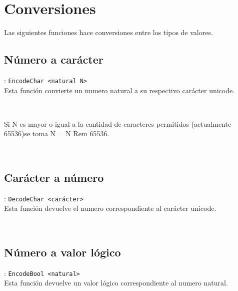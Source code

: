    \section{Conversiones}
      Las siguientes funciones hace conversiones entre los tipos de valores.
      
      \subsection*{Número a carácter}: \texttt{EncodeChar <natural N>}\\
      Esta función convierte un numero natural a su respectivo carácter unicode.
      
      \begin{fxcode}
         \\
      \end{fxcode}
      
      Si N es mayor o igual a la cantidad de caracteres permitidos (actualmente 65536)se toma N = N Rem 65536.
      
      \begin{fxcode}
         \\
         \outcode{\textquotesingle~\textquotesingle}
      \end{fxcode}
      
      \subsection*{Carácter a número}: \texttt{DecodeChar <carácter>}\\
      Esta función devuelve el numero correspondiente al carácter unicode.
      
      \begin{fxcode}
         \\
      \end{fxcode}
      
      \subsection*{Número a valor lógico}: \texttt{EncodeBool <natural>}\\
      Esta función devuelve un valor lógico correspondiente al numero natural.
      
      \begin{fxcode}
         \\
      \end{fxcode}
      
